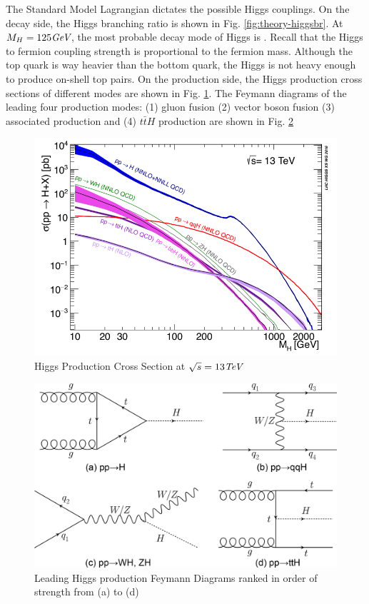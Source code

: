 The Standard Model Lagrangian dictates the possible Higgs couplings. On the decay side, the Higgs branching ratio is shown in Fig. \ref{fig:theory-higgsbr}. At $M_H = 125\textit{GeV}$, the most probable decay mode of Higgs is \Hbb. Recall that the Higgs to fermion coupling strength is proportional to the fermion mass. Although the top quark is way heavier than the bottom quark, the Higgs is not heavy enough to produce on-shell top pairs. On the production side, the Higgs production cross sections of different modes are shown in Fig. \ref{fig:theory-higgsp}. The Feymann diagrams of the leading four production modes: (1) gluon fusion (2) vector boson fusion (3) associated production and (4) $t\bar{t} H$ production are shown in Fig. \ref{fig:theory-higgsfeymann}


\begin{figure}[htpb!]
\begin{center}
  \includegraphics[width=0.6\linewidth]{figures/theory/HiggsCrossSection.png}
\caption{Higgs Production Cross Section at $\sqrt{s}= 13\textit{TeV}$}
\label{fig:theory-higgsp}
\end{center}
\end{figure}

\begin{figure}[htpb!]
\begin{center}
  \includegraphics[width=0.45\linewidth]{figures/theory/ProductionFeymann}
\caption{Leading Higgs production Feymann Diagrams ranked in order of strength from (a) to (d)}
\label{fig:theory-higgsfeymann}
\end{center}
\end{figure}


